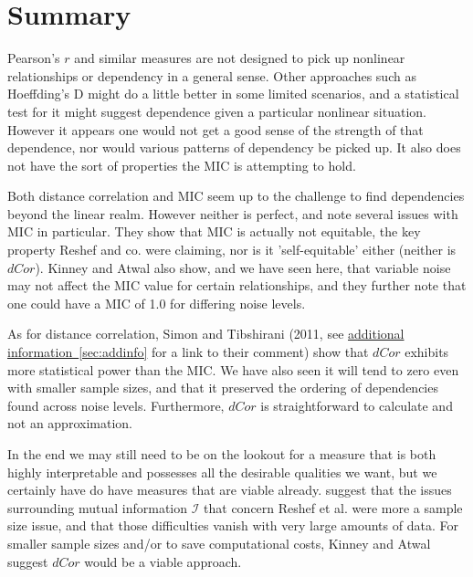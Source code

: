 \documentclass[english,nohyper,titlepage]{tufte-handout}\usepackage{graphicx, color}
\begin{document}
\part{Summary} %
Pearson's $r$ and similar measures are not designed to pick up nonlinear relationships or dependency in a general sense.  Other approaches such as Hoeffding's D might do a little better in some limited scenarios, and a statistical test for it might suggest dependence given a particular nonlinear situation.  However it appears one would not get a good sense of the strength of that dependence, nor would various patterns of dependency be picked up.  It also does not have the sort of properties the MIC is attempting to hold.

Both distance correlation and MIC seem up to the challenge to find dependencies beyond the linear realm. However neither is perfect, and \citet{kinney_equitability_2013} note several issues with MIC in particular.  They show that MIC is actually not equitable, the key property Reshef and co. were claiming, nor is it 'self-equitable' either (neither is $dCor$).  Kinney and Atwal also show, and we have seen here, that variable noise may not affect the MIC value for certain relationships, and they further note that one could have a MIC of 1.0 for differing noise levels.

As for distance correlation, Simon and Tibshirani (2011, see \hyperref[sec:addinfo]{additional information~\ref*{sec:addinfo}} for a link to their comment) show that $dCor$ exhibits more statistical power than the MIC.  We have also seen it will tend to zero even with smaller sample sizes, and that it preserved the ordering of dependencies found across noise levels.  Furthermore, $dCor$ is straightforward to calculate and not an approximation.  

In the end we may still need to be on the lookout for a measure that is both highly interpretable and possesses all the desirable qualities we want, but we certainly have do have measures that are viable already. \citet{kinney_equitability_2013} suggest that the issues surrounding mutual information $\mathcal{I}$ that concern Reshef et al. were more a sample size issue, and that those difficulties vanish with very large amounts of data.  For smaller sample sizes and/or to save computational costs, Kinney and Atwal suggest $dCor$ would be a viable approach.
\end{document}
